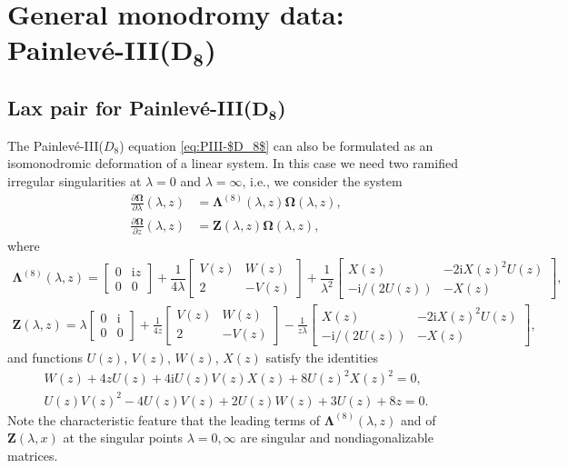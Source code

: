 \documentclass[11pt]{article}
\numberwithin{equation}{section}
\numberwithin{equation}{section}
\newcommand{\ii}{\mathrm{i}}
\begin{document}
\section[General monodromy data: Painlev\'e-III(D\_8)]{General monodromy data: Painlev\'e-III($\boldsymbol{D_8}$)} \label{sec:monodromy-rep-$D_8$}

\subsection[Lax pair for Painlev\'e-III(D\_8)]{Lax pair for Painlev\'e-III($\boldsymbol{D_8}$)}
\label{sec:lax-pair-$D_8$}

The Painlev\'e-III($D_8$) equation \eqref{eq:PIII-$D_8$} can also be formulated as an isomonodromic deformation of a linear system. In this case we need two ramified irregular singularities at $\lambda = 0$ and $\lambda = \infty$, i.e., we consider the system
\begin{align}\label{eq:lax_pair_D8}
\frac{\partial\mathbf{\Omega}}{\partial\lambda} (\lambda, z) &= {\mathbf{\Lambda}}^{(8)}(\lambda, z) \mathbf{\Omega}(\lambda, z), \\
\frac{\partial\mathbf{\Omega}}{\partial z} (\lambda, z) &= {\mathbf{Z}}(\lambda, z) \mathbf{\Omega}(\lambda, z),
\label{eq:lax_pair_D8_2}
\end{align}
where
\begin{gather*}
{\mathbf{\Lambda}}^{(8)}(\lambda, z) = \begin{bmatrix}0&{\ii z}{} \\0&0\end{bmatrix} +\dfrac{1}{4\lambda}\begin{bmatrix}V(z) & {W}(z)\\2 & -V(z)\end{bmatrix} + \dfrac{1}{\lambda^2}\begin{bmatrix}X(z) & -2\ii X(z)^2U(z)\\-\ii/(2U(z)) & -X(z)\end{bmatrix},
\\
{\mathbf{Z}}(\lambda, z) = \lambda\begin{bmatrix}0& {\ii} \\0&0\end{bmatrix} + \frac{1}{4z}\begin{bmatrix}V(z) & W(z)\\2 & -V(z)\end{bmatrix} - \frac{1}{z\lambda}\begin{bmatrix}X(z) & -2\ii X(z)^2U(z)\\-\ii/(2U(z)) & -X(z)\end{bmatrix},
\end{gather*}
and functions $U(z)$, $V(z)$, $W(z)$, $X(z)$ satisfy the identities
\begin{gather}
 W(z) +4zU(z) +4\ii U(z)V(z)X(z) + 8 U(z )^2X(z)^2 =0,
 \label{eq:UVWXidentity1}\\
 U(z) V(z)^2-4 U(z) V(z)+2 U(z) W(z)+3 U(z)+8 z=0.\label{eq:UVWidentity1}
\end{gather}
Note the characteristic feature that the leading terms of $\mathbf{\Lambda}^{(8)}(\lambda,z)$ and of $\mathbf{Z}(\lambda,x)$ at the singular points $\lambda=0,\infty$ are singular and nondiagonalizable matrices.
\end{document}

